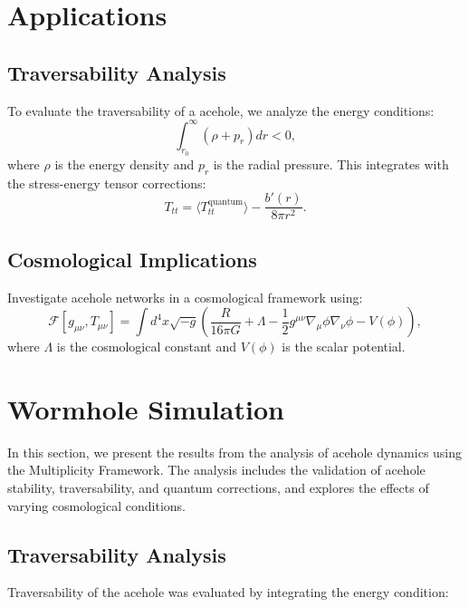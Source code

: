 \documentclass{article}
\theoremstyle{plain}
\begin{document}
\section{Applications}

\subsection{Traversability Analysis}
To evaluate the traversability of a acehole, we analyze the energy conditions:
\begin{equation}
    \int_{r_0}^\infty \left(\rho + p_r\right) dr < 0,
\end{equation}
where $\rho$ is the energy density and $p_r$ is the radial pressure. This integrates with the stress-energy tensor corrections:
\begin{equation}
    T_{tt} = \langle T_{tt}^{\text{quantum}} \rangle - \frac{b'(r)}{8\pi r^2}.
\end{equation}

\subsection{Cosmological Implications}
Investigate acehole networks in a cosmological framework using:
\begin{equation}
    \mathcal{F}[g_{\mu\nu}, T_{\mu\nu}] = \int d^4x \sqrt{-g} \left( \frac{R}{16\pi G} + \Lambda - \frac{1}{2}g^{\mu\nu}\nabla_\mu \phi \nabla_\nu \phi - V(\phi) \right),
\end{equation}
where $\Lambda$ is the cosmological constant and $V(\phi)$ is the scalar potential.

\section{Wormhole Simulation}

In this section, we present the results from the analysis of acehole dynamics using the Multiplicity Framework. The analysis includes the validation of acehole stability, traversability, and quantum corrections, and explores the effects of varying cosmological conditions.

\subsection{Traversability Analysis}

Traversability of the acehole was evaluated by integrating the energy condition:
\end{document}
